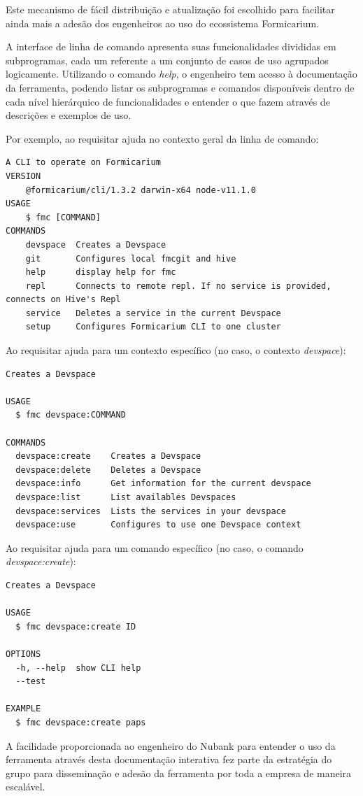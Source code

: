\documentclass[twosideprint]{politex}
\begin{document}
	Este mecanismo de fácil distribuição e atualização foi escolhido para facilitar ainda mais a adesão dos engenheiros ao uso do ecossistema Formicarium.

A interface de linha de comando apresenta suas funcionalidades divididas em subprogramas, cada um referente a um conjunto de casos de uso agrupados logicamente. Utilizando o comando \textit{help}, o engenheiro tem acesso à documentação da ferramenta, podendo listar os subprogramas e comandos disponíveis dentro de cada nível hierárquico de funcionalidades e entender o que fazem através de descrições e exemplos de uso.

Por exemplo, ao requisitar ajuda no contexto geral da linha de comando:

\begin{verbatim}
A CLI to operate on Formicarium
VERSION
    @formicarium/cli/1.3.2 darwin-x64 node-v11.1.0
USAGE
    $ fmc [COMMAND]
COMMANDS
    devspace  Creates a Devspace
    git       Configures local fmcgit and hive
    help      display help for fmc
    repl      Connects to remote repl. If no service is provided, connects on Hive's Repl
    service   Deletes a service in the current Devspace
    setup     Configures Formicarium CLI to one cluster
\end{verbatim}

Ao requisitar ajuda para um contexto específico (no caso, o contexto \textit{devspace}):
\begin{verbatim}
Creates a Devspace

USAGE
  $ fmc devspace:COMMAND

COMMANDS
  devspace:create    Creates a Devspace
  devspace:delete    Deletes a Devspace
  devspace:info      Get information for the current devspace
  devspace:list      List availables Devspaces
  devspace:services  Lists the services in your devspace
  devspace:use       Configures to use one Devspace context
\end{verbatim}


Ao requisitar ajuda para um comando específico (no caso, o comando \textit{devspace:create}):
\begin{verbatim}
Creates a Devspace

USAGE
  $ fmc devspace:create ID

OPTIONS
  -h, --help  show CLI help
  --test

EXAMPLE
  $ fmc devspace:create paps
\end{verbatim}


A facilidade proporcionada ao engenheiro do Nubank para entender o uso da ferramenta através desta documentação interativa fez parte da estratégia do grupo para disseminação e adesão da ferramenta por toda a empresa de maneira escalável.
\end{document}

